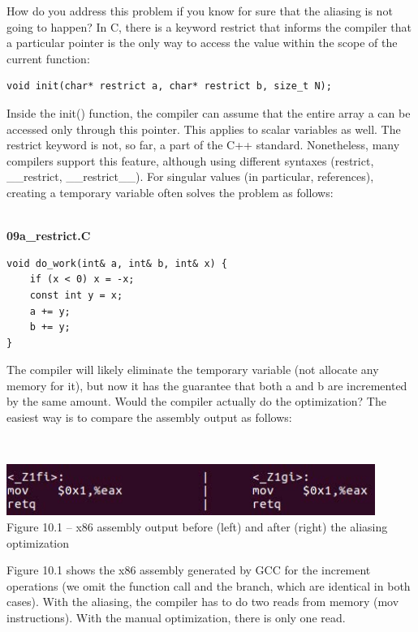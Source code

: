 How do you address this problem if you know for sure that the aliasing is not going to happen? In C, there is a keyword restrict that informs the compiler that a particular pointer is the only way to access the value within the scope of the current function:

\begin{lstlisting}[style=styleCXX]
void init(char* restrict a, char* restrict b, size_t N);
\end{lstlisting}

Inside the init() function, the compiler can assume that the entire array a can be accessed only through this pointer. This applies to scalar variables as well. The restrict keyword is not, so far, a part of the C++ standard. Nonetheless, many compilers support this feature, although using different syntaxes (restrict, \_\_restrict, \_\_restrict\_\_). For singular values (in particular, references), creating a temporary variable often solves the problem as follows:

\hspace*{\fill} \\ %
\noindent
\textbf{09a\_restrict.C}
\begin{lstlisting}[style=styleCXX]
void do_work(int& a, int& b, int& x) {
	if (x < 0) x = -x;
	const int y = x;
	a += y;
	b += y;
}
\end{lstlisting}

The compiler will likely eliminate the temporary variable (not allocate any memory for it), but now it has the guarantee that both a and b are incremented by the same amount. Would the compiler actually do the optimization? The easiest way is to compare the assembly output as follows:

\hspace*{\fill} \\ %
\begin{center}
\includegraphics[width=0.9\textwidth]{content/3/chapter10/images/1.jpg}\\
Figure 10.1 – x86 assembly output before (left) and after (right) the aliasing optimization
\end{center}

Figure 10.1 shows the x86 assembly generated by GCC for the increment operations (we omit the function call and the branch, which are identical in both cases). With the aliasing, the compiler has to do two reads from memory (mov instructions). With the manual optimization, there is only one read.

